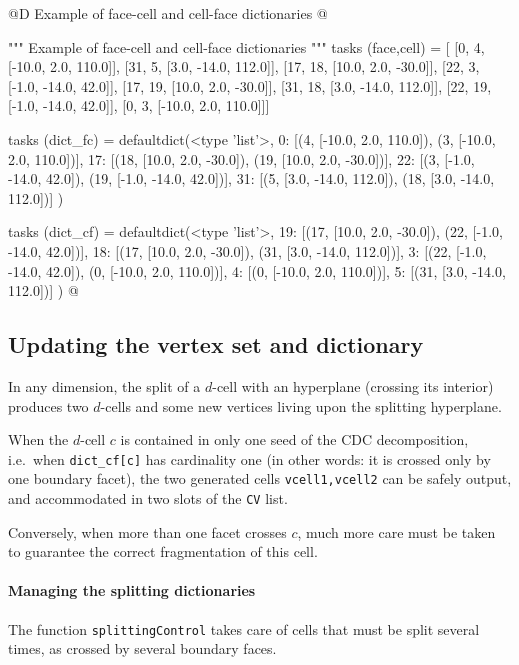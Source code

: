 \documentclass[11pt,oneside]{article}	%
\begin{document}
@D Example of face-cell and cell-face dictionaries
@{""" Example of face-cell and cell-face dictionaries """
tasks (face,cell) = [
 [0, 4, [-10.0, 2.0, 110.0]],
 [31, 5, [3.0, -14.0, 112.0]],
 [17, 18, [10.0, 2.0, -30.0]],
 [22, 3, [-1.0, -14.0, 42.0]],
 [17, 19, [10.0, 2.0, -30.0]],
 [31, 18, [3.0, -14.0, 112.0]],
 [22, 19, [-1.0, -14.0, 42.0]],
 [0, 3, [-10.0, 2.0, 110.0]]]

tasks (dict_fc) = defaultdict(<type 'list'>, {
  0: [(4, [-10.0, 2.0, 110.0]), (3, [-10.0, 2.0, 110.0])],
 17: [(18, [10.0, 2.0, -30.0]), (19, [10.0, 2.0, -30.0])],
 22: [(3, [-1.0, -14.0, 42.0]), (19, [-1.0, -14.0, 42.0])],
 31: [(5, [3.0, -14.0, 112.0]), (18, [3.0, -14.0, 112.0])]  })

tasks (dict_cf) = defaultdict(<type 'list'>, {
 19: [(17, [10.0, 2.0, -30.0]), (22, [-1.0, -14.0, 42.0])],
 18: [(17, [10.0, 2.0, -30.0]), (31, [3.0, -14.0, 112.0])],
  3: [(22, [-1.0, -14.0, 42.0]), (0, [-10.0, 2.0, 110.0])],
  4: [(0, [-10.0, 2.0, 110.0])],
  5: [(31, [3.0, -14.0, 112.0])]  })
@}


\subsection{Updating the vertex set and dictionary}

In any dimension, the split of a $d$-cell with an hyperplane (crossing its interior) produces two $d$-cells and some new vertices living upon the splitting hyperplane.

When the $d$-cell $c$ is contained in only one seed of the CDC decomposition, i.e.~when \texttt{dict\_cf[c]} has cardinality one (in other words: it is crossed only by one boundary facet), the two generated cells \texttt{vcell1,vcell2} can be safely output, and accommodated in two slots of the \texttt{CV} list.

Conversely, when more than one facet crosses $c$, much more care must be taken to guarantee the correct fragmentation of this cell.


\paragraph{Managing the splitting dictionaries}
The function \texttt{splittingControl} takes care of cells that must be split several times, as crossed by several boundary faces. 
\end{document}
